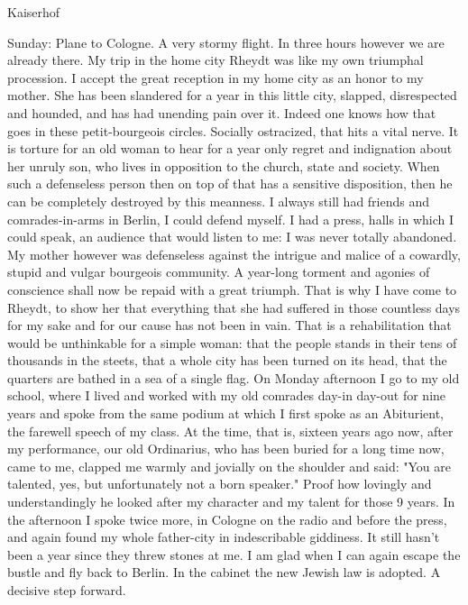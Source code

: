 Kaiserhof

Sunday: Plane to Cologne. A very stormy flight. In three hours however we are already there. My trip in the home city Rheydt was like my own triumphal procession. I accept the great reception in my home city as an honor to my mother. She has been slandered for a year in this little city, slapped, disrespected and hounded, and has had unending pain over it. Indeed one knows how that goes in these petit-bourgeois circles. Socially ostracized, that hits a vital nerve. It is torture for an old woman to hear for a year only regret and indignation about her unruly son, who lives in opposition to the church, state and society.
When such a defenseless person then on top of that has a sensitive disposition, then he can be completely destroyed by this meanness. I always still had friends and comrades-in-arms in Berlin, I could defend myself. I had a press, halls in which I could speak, an audience that would listen to me: I was never totally abandoned. My mother however was defenseless against the intrigue and malice of a cowardly, stupid and vulgar bourgeois community. A year-long torment and agonies of conscience shall now be repaid  with a great triumph. That is why I have come to Rheydt, to show her that everything that she had suffered in those countless days for my sake and for our cause has not been in vain. That is a rehabilitation that would be unthinkable for a simple woman: that the people stands in their tens of thousands in the steets, that a whole city has been turned on its head, that the quarters are bathed in a sea of a single flag. On Monday afternoon I go to my old school, where I lived and worked with my old comrades day-in day-out for nine years and spoke from the same podium at which I first spoke as an Abiturient, the farewell speech of my class. At the time, that is, sixteen years ago now, after my performance, our old Ordinarius, who has been buried for a long time now, came to me, clapped me warmly and jovially on the shoulder and said: "You are talented, yes, but unfortunately not a born speaker." Proof how lovingly and understandingly he looked after my character and my talent for those 9 years. In the afternoon I spoke twice more, in Cologne on the radio and before the press, and again found my whole father-city in indescribable giddiness. It still hasn't been a year since they threw stones at me. I am glad when I can again escape the bustle and fly back to Berlin. In the cabinet the new Jewish law is adopted. A decisive step forward.
